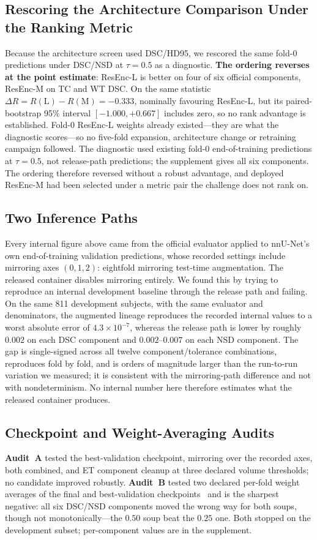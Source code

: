 \documentclass[runningheads]{llncs}
\begin{document}
\subsection{Rescoring the Architecture Comparison Under the Ranking Metric}
\label{sec:arch2}
Because the architecture screen used DSC/HD95, we rescored the same fold-0 predictions under DSC/NSD
at $\tau=0.5$ as a diagnostic. \textbf{The ordering reverses at the point estimate}: ResEnc-L is
better on four of six official components, ResEnc-M on TC and WT DSC. On the same statistic
$\Delta R = R(\mathrm{L})-R(\mathrm{M}) = -0.333$, nominally favouring ResEnc-L, but its
paired-bootstrap 95\% interval $[-1.000,+0.667]$ includes zero, so no rank advantage is established.
Fold-0 ResEnc-L weights already existed---they are what the diagnostic scores---so no five-fold
expansion, architecture change or retraining campaign followed. The diagnostic used existing fold-0
end-of-training predictions at $\tau=0.5$, not release-path predictions; the supplement gives all six
components. The ordering therefore reversed without a robust advantage, and deployed ResEnc-M had
been selected under a metric pair the challenge does not rank on.

\subsection{Two Inference Paths}
\label{sec:twopaths}
Every internal figure above came from the official evaluator applied to nnU-Net's own end-of-training
validation predictions, whose recorded settings include mirroring axes $(0,1,2)$: eightfold
mirroring test-time augmentation. The released container disables mirroring entirely. We found this by trying
to reproduce an internal development baseline through the release path and failing. On the same 811
development subjects, with the same evaluator and denominators, the augmented lineage reproduces the
recorded internal values to a worst absolute error of $4.3\times10^{-7}$, whereas the release path is
lower by roughly $0.002$ on each DSC component and $0.002$--$0.007$ on each NSD component. The gap is
single-signed across all twelve component/tolerance combinations, reproduces fold by fold, and is
orders of magnitude larger than the run-to-run variation we measured; it is consistent with the
mirroring-path difference and not with nondeterminism. No internal number here therefore estimates
what the released container produces.

\subsection{Checkpoint and Weight-Averaging Audits}
\label{sec:audits}
\textbf{Audit~A} tested the best-validation checkpoint, mirroring over the recorded axes, both
combined, and ET component cleanup at three declared volume thresholds; no candidate improved
robustly. \textbf{Audit~B} tested two declared per-fold weight averages of the final and
best-validation checkpoints~\cite{wortsman2022modelsoups} and is the sharpest negative: all six
DSC/NSD components moved the wrong way for both soups, though not monotonically---the $0.50$ soup
beat the $0.25$ one. Both stopped on
the development subset; per-component values are in the supplement.
\end{document}
